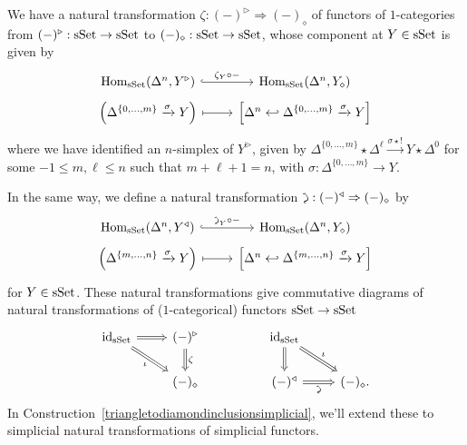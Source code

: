 \documentclass{tac}
\newcommand{\tx}[1]{\textnormal{#1}}
\DeclareRobustCommand{\atez}{\text{\reflectbox{$\zeta$}}}
\begin{document}
\begin{construction}\label{triangletodiamondinclusion} We have a natural transformation $\zeta : (-)^\triangleright \Rightarrow (-)_\diamond$ of functors of $1$-categories from $(-)^\triangleright : \tx{sSet} \to \tx{sSet}$ to $(-)_\diamond : \tx{sSet} \to \tx{sSet}$, whose component at $Y \in \tx{sSet}$ is given by 
\[\begin{tikzcd}
\tx{Hom}_{\tx{sSet}} (\Delta^n , Y^\triangleright ) \arrow[hook]{r}{\zeta_Y \circ -} & \tx{Hom}_{\tx{sSet}} (\Delta^n , Y_\diamond ) \\[-1.5em]
\left( \Delta^{\{ 0 ,\dots , m \}} \xrightarrow{\sigma} Y \right) \arrow[mapsto]{r} & \left[ \Delta^n \hookleftarrow \Delta^{\{ 0 ,\dots , m \}} \xrightarrow{\sigma} Y \right]
\end{tikzcd}\]
where we have identified an $n$-simplex of $Y^\triangleright$, given by   $\Delta^{\{ 0 ,\dots , m \}} \star \Delta^\ell \xrightarrow{\sigma \star !} Y \star \Delta^0$ for some $-1\leq m,\ell \leq n$ such that $m + \ell +1=n$, with $\sigma : \Delta^{\{ 0 ,\dots , m \}} \to Y$.

\hfill

In the same way, we define a natural transformation $\atez : (-)^\triangleleft \Rightarrow (-)_\diamond$ by
\[\begin{tikzcd}
\tx{Hom}_{\tx{sSet}} (\Delta^n , Y^\triangleleft ) \arrow[hook]{r}{\atez_Y \circ -} & \tx{Hom}_{\tx{sSet}} (\Delta^n , Y_\diamond ) \\[-1.5em]
\left( \Delta^{\{ m ,\dots , n \}} \xrightarrow{\sigma} Y \right) \arrow[mapsto]{r} & \left[ \Delta^n \hookleftarrow \Delta^{\{ m ,\dots , n \}} \xrightarrow{\sigma} Y \right] 
\end{tikzcd}\]
for $Y \in \tx{sSet}$.  These natural transformations give commutative diagrams of natural transformations of ($1$-categorical) functors $\tx{sSet} \to \tx{sSet}$
\begin{equation}\label{triangletodiamondinclusioncommutativetriangles}\begin{tikzcd}
\tx{id}_{\tx{sSet}} \arrow[Rightarrow]{r} \arrow[Rightarrow]{dr}[swap]{\iota} & (-)^\triangleright \arrow[Rightarrow]{d}{\zeta} & & \tx{id}_{\tx{sSet}} \arrow[Rightarrow]{d} \arrow[Rightarrow]{dr}{\iota} & \\
& (-)_\diamond & & (-)^\triangleleft \arrow[Rightarrow]{r}[swap]{\atez} & (-)_\diamond .
\end{tikzcd}\end{equation}
In Construction~\ref{triangletodiamondinclusionsimplicial}, we'll extend these to simplicial natural transformations of simplicial functors.
\end{construction}
\end{document}
